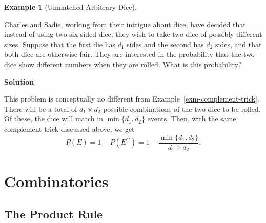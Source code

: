 \documentclass[
  letterpaper,
  DIV=11,
  numbers=noendperiod]{scrreprt}
\theoremstyle{definition}
\theoremstyle{definition}
\newtheorem{example}{Example}[chapter]
\theoremstyle{definition}
\theoremstyle{remark}
\begin{document}
\begin{example}[Unmatched Arbitrary
Dice]\protect\hypertarget{exm-complement-trick-two}{}\label{exm-complement-trick-two}

Charles and Sadie, working from their intrigue about dice, have decided
that instead of using two six-sided dice, they wish to take two dice of
possibly different sizes. Suppose that the first die has \(d_1\) sides
and the second has \(d_2\) sides, and that both dice are otherwise fair.
They are interested in the probability that the two dice show different
numbers when they are rolled. What is this probability?

\begin{tcolorbox}[enhanced jigsaw, colback=white, colframe=quarto-callout-color-frame, arc=.35mm, leftrule=.75mm, rightrule=.15mm, opacityback=0, breakable, bottomrule=.15mm, left=2mm, toprule=.15mm]

\vspace{-3mm}\textbf{Solution}\vspace{3mm}

This problem is conceptually no different from
Example~\ref{exm-complement-trick}. There will be a total of
\(d_1\times d_2\) possible combinations of the two dice to be
rolled.\footnotemark{} Of these, the dice will match in
\(\min\{d_1, d_2\}\) events.\footnotemark{} Then, with the same
complement trick discussed above, we get
\[P(E) = 1 - P(E^C) = 1 - \frac{\min\{d_1,d_2\}}{d_1\times d_2}.\]

\end{tcolorbox}



\end{example}

\section{Combinatorics}\label{combinatorics}

\subsection{The Product Rule}\label{the-product-rule}
\end{document}
